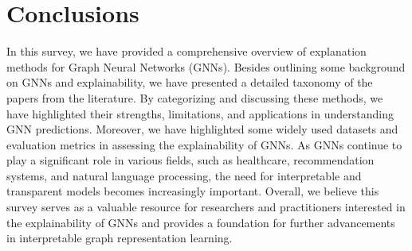 \section{Conclusions}
\label{sec:sourav_conclusion}
In this survey, we have provided a comprehensive overview of explanation methods for Graph Neural Networks (GNNs). Besides outlining some background on GNNs and explainability, we have presented a detailed taxonomy of the papers from the literature. By categorizing and discussing these methods, we have highlighted their strengths, limitations, and applications in understanding GNN predictions. Moreover, we have highlighted some widely used datasets and evaluation metrics in assessing the explainability of GNNs. As GNNs continue to play a significant role in various fields, such as healthcare, recommendation systems, and natural language processing, the need for interpretable and transparent models becomes increasingly important. Overall, we believe this survey serves as a valuable resource for researchers and practitioners interested in the explainability of GNNs and provides a foundation for further advancements in interpretable graph representation learning. %


 


